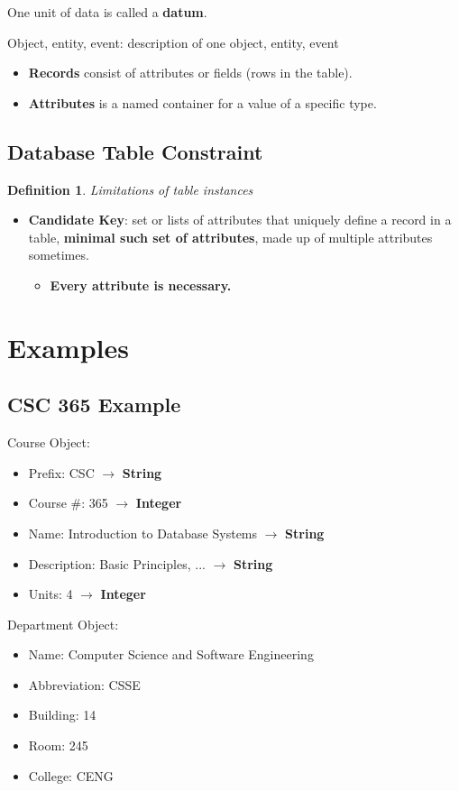 \documentclass[twoside]{article}
\newtheorem{definition}[theorem]{Definition}
\begin{document}
One unit of data is called a \textbf{datum}.

Object, entity, event: description of one object, entity, event
\begin{itemize}
    \item \textbf{Records} consist of attributes or fields (rows in the 
    table).
    \item \textbf{Attributes} is a named container for a value of a specific type.
\end{itemize}

\subsection*{Database Table Constraint}
\begin{definition}
    Limitations of table instances
\end{definition}
\begin{itemize}
    \item \textbf{Candidate Key}: set or lists of attributes that uniquely
    define a record in a table, \textbf{minimal such set of attributes},
    made up of multiple attributes sometimes.
    \begin{itemize}
        \item \textbf{Every attribute is necessary.}
    \end{itemize}
\end{itemize}

\section*{Examples}
\subsection*{CSC 365 Example}

Course Object:
\begin{itemize}
    \item Prefix: CSC $\longrightarrow$ \textbf{String}
    \item Course \#: 365 $\longrightarrow$ \textbf{Integer}
    \item Name: Introduction to Database Systems $\longrightarrow$ \textbf{String}
    \item Description: Basic Principles, ... $\longrightarrow$ \textbf{String}
    \item Units: 4 $\longrightarrow$ \textbf{Integer}
\end{itemize}
Department Object:
\begin{itemize}
    \item Name: Computer Science and Software Engineering
    \item Abbreviation: CSSE
    \item Building: 14
    \item Room: 245
    \item College: CENG
\end{itemize}
\end{document}
